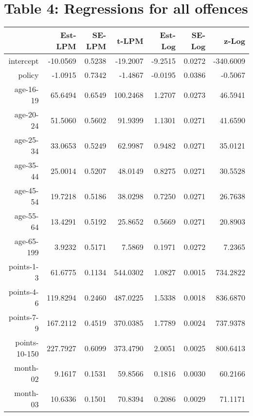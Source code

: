 \documentclass[10pt]{article}
\begin{document}
\clearpage
\pagebreak




\section*{Table 4: Regressions for all offences}




\begin{table}[ht]
\centering
\begin{tabular}{rrrrrrr}
  \hline
 & Est-LPM & SE-LPM & t-LPM & Est-Log & SE-Log & z-Log \\ 
  \hline
intercept & -10.0569 & 0.5238 & -19.2007 & -9.2515 & 0.0272 & -340.6009 \\ 
  policy & -1.0915 & 0.7342 & -1.4867 & -0.0195 & 0.0386 & -0.5067 \\ 
  age-16-19 & 65.6494 & 0.6549 & 100.2468 & 1.2707 & 0.0273 & 46.5941 \\ 
  age-20-24 & 51.5060 & 0.5602 & 91.9399 & 1.1301 & 0.0271 & 41.6590 \\ 
  age-25-34 & 33.0653 & 0.5249 & 62.9987 & 0.9482 & 0.0271 & 35.0121 \\ 
  age-35-44 & 25.0014 & 0.5207 & 48.0149 & 0.8275 & 0.0271 & 30.5528 \\ 
  age-45-54 & 19.7218 & 0.5186 & 38.0298 & 0.7250 & 0.0271 & 26.7638 \\ 
  age-55-64 & 13.4291 & 0.5192 & 25.8652 & 0.5669 & 0.0271 & 20.8903 \\ 
  age-65-199 & 3.9232 & 0.5171 & 7.5869 & 0.1971 & 0.0272 & 7.2365 \\ 
  points-1-3 & 61.6775 & 0.1134 & 544.0302 & 1.0827 & 0.0015 & 734.2822 \\ 
  points-4-6 & 119.8294 & 0.2460 & 487.0225 & 1.5338 & 0.0018 & 836.6870 \\ 
  points-7-9 & 167.2112 & 0.4519 & 370.0385 & 1.7789 & 0.0024 & 737.9378 \\ 
  points-10-150 & 227.7927 & 0.6099 & 373.4790 & 2.0051 & 0.0025 & 800.6413 \\ 
  month-02 & 9.1617 & 0.1531 & 59.8566 & 0.1816 & 0.0030 & 60.2166 \\ 
  month-03 & 10.6336 & 0.1501 & 70.8394 & 0.2086 & 0.0029 & 71.1171 \\ 

\end{tabular}
\end{table}
\end{document}
